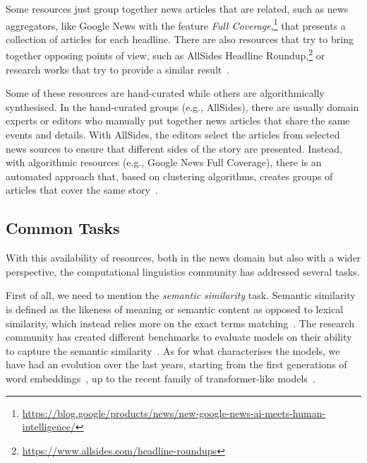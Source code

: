 Some resources just group together news articles that are related, such as news aggregators, like Google News with the feature \emph{Full Coverage},\footnote{\url{https://blog.google/products/news/new-google-news-ai-meets-human-intelligence/}} that presents a collection of articles for each headline.
There are also resources that try to bring together opposing points of view, such as AllSides Headline Roundup,\footnote{\url{https://www.allsides.com/headline-roundups}} or research works that try to provide a similar result~\citep{trampuvs2015diversinews,park2009newscube}.



Some of these resources are hand-curated while others are algorithmically synthesised. In the hand-curated groups (e.g., AllSides), there are usually domain experts or editors who manually put together news articles that share the same events and details. With AllSides, the editors select the articles from selected news sources to ensure that different sides of the story are presented.
Instead, with algorithmic resources (e.g., Google News Full Coverage), there is an automated approach that, based on clustering algorithms, creates groups of articles that cover the same story~\citep{marutho2018determination,alelyani2018feature,karimi2018news}.

\subsection{\statusgreen Common Tasks}
\label{ssec:lit_relationships_tasks}

With this availability of resources, both in the news domain but also with a wider perspective, the computational linguistics community has addressed several tasks.

First of all, we need to mention the \textit{semantic similarity} task.
Semantic similarity is defined as the likeness of meaning or semantic content as opposed to lexical similarity, which instead relies more on the exact terms matching~\citep{harispe2015semantic}.
The research community has created different benchmarks to evaluate models on their ability to capture the semantic similarity~\citep{conneau-kiela-2018-senteval,chandrasekaran2021evolution}.
As for what characterises the models, we have had an evolution over the last years, starting from the first generations of word embeddings~\citep{pennington2014glove,mikolov2013efficient}, up to the recent family of transformer-like models~\citep{devlin2018bert,cer2018universal,yang2019xlnet,reimers2019sentence}.

